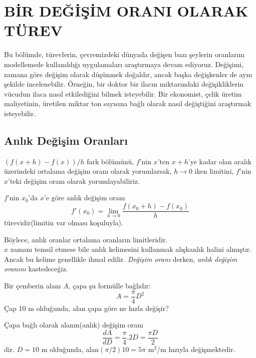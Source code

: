 \chapter{\protect BİR DEĞİŞİM ORANI OLARAK TÜREV}
Bu bölümde, türevlerin, çevremizdeki dünyada değişen bazı şeylerin oranlarını modellemede kullanıldığı uygulamaları araştırmaya devam ediyoruz. Değişimi, zamana göre değişim olarak düşünmek doğaldır, ancak başka değişkenler de aynı şekilde incelenebilir. Örneğin, bir doktor bir ilacın miktarındaki değişikliklerin vücudun ilaca nasıl etkilediğini bilmek isteyebilir. Bir ekonomist, çelik üretim maliyetinin, üretilen miktar ton sayısına bağlı olarak nasıl değiştiğini araştırmak isteyebilir.

\section{\protect Anlık Değişim Oranları} \label{bolumetiketi}
$(f(x+h)-f(x))/h$ fark bölümünü, $f$'nin $x$'ten $x+h$'ye kadar olan aralık üzerindeki ortalama değişim oranı olarak yorumlarsak, $h \rightarrow 0$ iken limitini, $f$'nin $x$'teki değişim oranı olarak yorumlayabiliriz.
\begin{tanim}
	$f$'nin $x_0$'da $x$'e göre anlık değişim oranı
	\begin{equation*}
	f'(x_0)=\lim_{h \rightarrow 0}\frac{f(x_0+h)-f(x_0)}{h}
	\end{equation*}
türevidir(limitin var olması koşuluyla).
\end{tanim}
Böylece, anlık oranlar ortalama oranların limitleridir.\\
	$x$ zamanı temsil etmese bile anlık kelimesini kullanmak alışkanlık halini almıştır. Ancak bu kelime genellikle ihmal edilir. \textit{Değişim oranı} derken, \textit{anlık değişim oranını} kastedeceğiz.
\begin{ornek}
	Bir çemberin alanı $A$, çapa şu formülle bağlıdır:
	\begin{equation*}
	A=\frac{\pi}{4}D^2
	\end{equation*}
Çap 10 m olduğunda, alan çapa göre ne hızla değişir?
\end{ornek}
\begin{cozum}
	Çapa bağlı olarak alanın(anlık) değişim oranı
	\begin{equation*}
	\frac{dA}{dD}=\frac{\pi}{4}.2D=\frac{\pi D}{2}
	\end{equation*}
dir. $D = 10$ m olduğunda, alan$(\pi/2)10=5\pi$ m$^2$/m hızıyla değişmektedir.
\end{cozum}
\\


